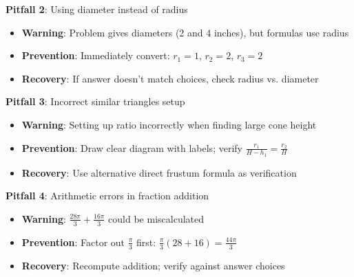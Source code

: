 \documentclass[]{article}
\begin{document}
\begin{solutionbox}
\textbf{Pitfall 2}: Using diameter instead of radius
\begin{itemize}
    \item \textbf{Warning}: Problem gives diameters (2 and 4 inches), but formulas use radius
    \item \textbf{Prevention}: Immediately convert: $r_1 = 1$, $r_2 = 2$, $r_3 = 2$
    \item \textbf{Recovery}: If answer doesn't match choices, check radius vs. diameter
\end{itemize}

\textbf{Pitfall 3}: Incorrect similar triangles setup
\begin{itemize}
    \item \textbf{Warning}: Setting up ratio incorrectly when finding large cone height
    \item \textbf{Prevention}: Draw clear diagram with labels; verify $\frac{r_1}{H-h_1} = \frac{r_2}{H}$
    \item \textbf{Recovery}: Use alternative direct frustum formula as verification
\end{itemize}

\textbf{Pitfall 4}: Arithmetic errors in fraction addition
\begin{itemize}
    \item \textbf{Warning}: $\frac{28\pi}{3} + \frac{16\pi}{3}$ could be miscalculated
    \item \textbf{Prevention}: Factor out $\frac{\pi}{3}$ first: $\frac{\pi}{3}(28+16) = \frac{44\pi}{3}$
    \item \textbf{Recovery}: Recompute addition; verify against answer choices
\end{itemize}
\end{solutionbox}
\end{document}

